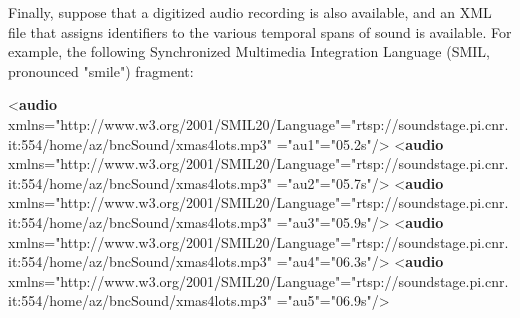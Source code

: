 Finally, suppose that a digitized audio recording is also available, and an XML file that assigns identifiers to the various temporal spans of sound is available. For example, the following Synchronized Multimedia Integration Language (SMIL, pronounced "smile") fragment: \par\bgroup\exampleFont \begin{shaded}\noindent\mbox{}{<\textbf{audio} xmlns="http://www.w3.org/2001/SMIL20/Language"\hspace*{1em}{src}="{rtsp://soundstage.pi.cnr.it:554/home/az/bncSound/xmas4lots.mp3}"\mbox{}\newline 
\hspace*{1em}{xml:id}="{au1}"\hspace*{1em}{begin}="{05.2s}"/>}\mbox{}\newline 
{<\textbf{audio} xmlns="http://www.w3.org/2001/SMIL20/Language"\hspace*{1em}{src}="{rtsp://soundstage.pi.cnr.it:554/home/az/bncSound/xmas4lots.mp3}"\mbox{}\newline 
\hspace*{1em}{xml:id}="{au2}"\hspace*{1em}{begin}="{05.7s}"/>}\mbox{}\newline 
{<\textbf{audio} xmlns="http://www.w3.org/2001/SMIL20/Language"\hspace*{1em}{src}="{rtsp://soundstage.pi.cnr.it:554/home/az/bncSound/xmas4lots.mp3}"\mbox{}\newline 
\hspace*{1em}{xml:id}="{au3}"\hspace*{1em}{begin}="{05.9s}"/>}\mbox{}\newline 
{<\textbf{audio} xmlns="http://www.w3.org/2001/SMIL20/Language"\hspace*{1em}{src}="{rtsp://soundstage.pi.cnr.it:554/home/az/bncSound/xmas4lots.mp3}"\mbox{}\newline 
\hspace*{1em}{xml:id}="{au4}"\hspace*{1em}{begin}="{06.3s}"/>}\mbox{}\newline 
{<\textbf{audio} xmlns="http://www.w3.org/2001/SMIL20/Language"\hspace*{1em}{src}="{rtsp://soundstage.pi.cnr.it:554/home/az/bncSound/xmas4lots.mp3}"\mbox{}\newline 
\hspace*{1em}{xml:id}="{au5}"\hspace*{1em}{begin}="{06.9s}"/>}\mbox{}\newline 

\end{shaded}
